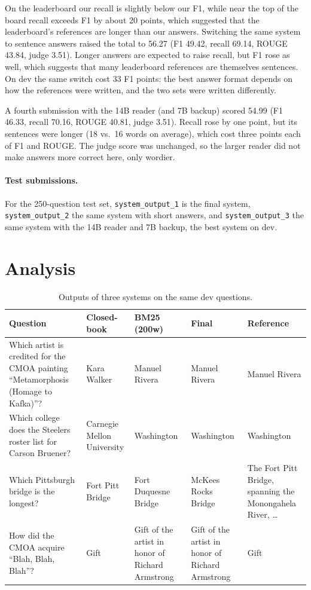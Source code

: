 \documentclass[11pt]{article}
\begin{document}
On the leaderboard our recall is slightly below our F1, while near the top of the board recall exceeds F1 by about 20 points, which suggested that the leaderboard's references are longer than our answers. Switching the same system to sentence answers raised the total to 56.27 (F1 49.42, recall 69.14, ROUGE 43.84, judge 3.51). Longer answers are expected to raise recall, but F1 rose as well, which suggests that many leaderboard references are themselves sentences. On dev the same switch cost 33 F1 points: the best answer format depends on how the references were written, and the two sets were written differently.

A fourth submission with the 14B reader (and 7B backup) scored 54.99 (F1 46.33, recall 70.16, ROUGE 40.81, judge 3.51). Recall rose by one point, but its sentences were longer (18 vs.\ 16 words on average), which cost three points each of F1 and ROUGE. The judge score was unchanged, so the larger reader did not make answers more correct here, only wordier.

\paragraph{Test submissions.} For the 250-question test set, \texttt{system\_output\_1} is the final system, \texttt{system\_output\_2} the same system with short answers, and \texttt{system\_output\_3} the same system with the 14B reader and 7B backup, the best system on dev.

\section{Analysis}
\label{sec:analysis}

\begin{table}[t]
  \centering
  \small
  \begin{tabular}{p{4.6cm}p{2.3cm}p{2.3cm}p{2.3cm}p{2.6cm}}
    \toprule
    Question & Closed-book & BM25 (200w) & Final & Reference \\
    \midrule
    Which artist is credited for the CMOA painting ``Metamorphosis (Homage to Kafka)''? & Kara Walker & Manuel Rivera & Manuel Rivera & Manuel Rivera \\
    Which college does the Steelers roster list for Carson Bruener? & Carnegie Mellon University & Washington & Washington & Washington \\
    Which Pittsburgh bridge is the longest? & Fort Pitt Bridge & Fort Duquesne Bridge & McKees Rocks Bridge & The Fort Pitt Bridge, spanning the Monongahela River, \ldots \\
    How did the CMOA acquire ``Blah, Blah, Blah''? & Gift & Gift of the artist in honor of Richard Armstrong & Gift of the artist in honor of Richard Armstrong & Gift \\
    \bottomrule
  \end{tabular}
  \caption{Outputs of three systems on the same dev questions.}
  \label{tab:examples}
\end{table}
\end{document}
